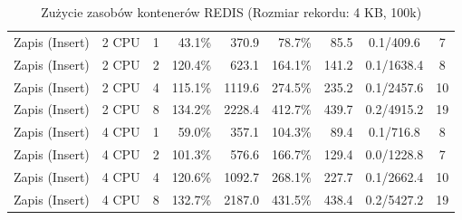 \begin{table}[ht]
{\begin{tabular}{llcrrrrcc}
Zapis (Insert) & 2 CPU & 1 & 43.1\% & 370.9 & 78.7\% & 85.5 & 0.1/409.6 & 7 \\
Zapis (Insert) & 2 CPU & 2 & 120.4\% & 623.1 & 164.1\% & 141.2 & 0.1/1638.4 & 8 \\
Zapis (Insert) & 2 CPU & 4 & 115.1\% & 1119.6 & 274.5\% & 235.2 & 0.1/2457.6 & 10 \\
Zapis (Insert) & 2 CPU & 8 & 134.2\% & 2228.4 & 412.7\% & 439.7 & 0.2/4915.2 & 19 \\
Zapis (Insert) & 4 CPU & 1 & 59.0\% & 357.1 & 104.3\% & 89.4 & 0.1/716.8 & 8 \\
Zapis (Insert) & 4 CPU & 2 & 101.3\% & 576.6 & 166.7\% & 129.4 & 0.0/1228.8 & 7 \\
Zapis (Insert) & 4 CPU & 4 & 120.6\% & 1092.7 & 268.1\% & 227.7 & 0.1/2662.4 & 10 \\
Zapis (Insert) & 4 CPU & 8 & 132.7\% & 2187.0 & 431.5\% & 438.4 & 0.2/5427.2 & 19 \\
\bottomrule
\end{tabular}%
}
\caption{Zużycie zasobów kontenerów REDIS (Rozmiar rekordu: 4 KB, 100k)}
\label{tab:resources_redis_medium_100000}
\end{table}
